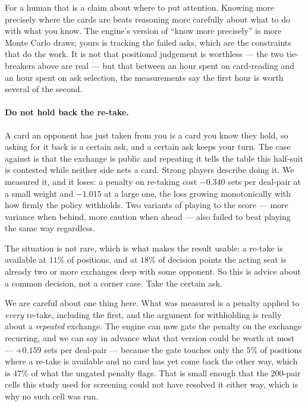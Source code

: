 \documentclass[11pt,a4paper]{article}
\begin{document}
For a human that is a claim about where to put attention. Knowing more precisely
where the cards are beats reasoning more carefully about what to do with what
you know. The engine's version of ``know more precisely'' is more Monte Carlo
draws; yours is tracking the failed asks, which are the constraints that do the
work. It is not that positional judgement is worthless --- the two tie-breakers
above are real --- but that between an hour spent on card-reading and an hour
spent on ask selection, the measurements say the first hour is worth several of
the second.

\paragraph{Do not hold back the re-take.} A card an opponent has just taken from
you is a card you know they hold, so asking for it back is a certain ask, and a
certain ask keeps your turn. The case against is that the exchange is public and
repeating it tells the table this half-suit is contested while neither side nets
a card. Strong players describe doing it. We measured it, and it loses: a penalty
on re-taking cost $-0.340$ sets per deal-pair at a small weight and $-1.015$ at a
large one, the loss growing monotonically with how firmly the policy withholds.
Two variants of playing to the score --- more variance when behind, more caution
when ahead --- also failed to beat playing the same way regardless.

The situation is not rare, which is what makes the result usable: a re-take is
available at $11\%$ of positions, and at $18\%$ of decision points the acting
seat is already two or more exchanges deep with some opponent. So this is advice
about a common decision, not a corner case. Take the certain ask.

We are careful about one thing here. What was measured is a penalty applied to
\emph{every} re-take, including the first, and the argument for withholding is
really about a \emph{repeated} exchange. The engine can now gate the penalty on
the exchange recurring, and we can say in advance what that version could be
worth at most --- $+0.159$ sets per deal-pair --- because the gate touches only
the $5\%$ of positions where a re-take is available and no card has yet come
back the other way, which is $47\%$ of what the ungated penalty flags.
That is small enough that the $200$-pair cells this study used for screening
could not have resolved it either way, which is why no such cell was run.
\end{document}
